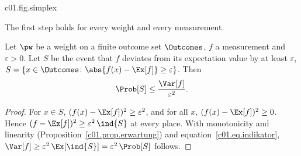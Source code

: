 \begin{vertiefung}
  \begin{tpcfigure}{c01.fig.simplex}
    \caption{The set of all weights. (a) Two outcomes: the segment between the point
      weights $\pw_1 = (1,0)$ and $\pw_2 = (0,1)$ in the plane of the coordinates
      $\pw(1)$, $\pw(2)$; marked is $\pw = (\tfrac14, \tfrac34)$. (b) Three
      outcomes: a triangle with the point weights as corners. Marked are the uniform
      weight $(\tfrac13, \tfrac13, \tfrac13)$ at the centroid and the weight
      $(\tfrac12, \tfrac13, \tfrac16)$, which lies closer to $\pw_1$. Filled points are
      point weights, open circles proper mixtures.}
  \end{tpcfigure}
\end{vertiefung}

\begin{vertiefung}[id=c01.v2,
    titel={How close are relative frequencies to the probabilities?},
    wozu={The Core restricts the statistical reading to independent repetitions of the
      same preparation. Here an upper bound on the probability of a deviation of the
      relative frequency by at least $\varepsilon > 0$ is proved; this bound decreases
      with the positive integer number of repetitions.},
    voraussetzung={Sections~\ref{c01.s2} and~\ref{c01.s3} up to
      equation~\eqref{c01.eq.var-indikator}. The rest of the course uses only the result
      in words.},
    zurueck={The probability that the relative frequency of an event after $N$ independent
      repetitions deviates from its probability by at least $\varepsilon$ is at most
      $1/(4N\varepsilon^2)$.}]
  The first step holds for every weight and every measurement.

  \begin{lemma}\label{c01.lem.tschebyscheff}
    Let $\pw$ be a weight on a finite outcome set $\Outcomes$, $f$ a measurement
    and $\varepsilon > 0$. Let $S$ be the event that $f$ deviates from its expectation
    value by at least $\varepsilon$,
    $S = \{x \in \Outcomes \colon \abs{f(x) - \Ex[f]} \geq \varepsilon\}$. Then
    \begin{equation}\label{c01.eq.tschebyscheff}
      \Prob[S] \leq \frac{\Var[f]}{\varepsilon^2} .
    \end{equation}
  \end{lemma}
  \begin{proof}
    For $x \in S$, $(f(x) - \Ex[f])^2 \geq \varepsilon^2$, and for all $x$,
    $(f(x) - \Ex[f])^2 \geq 0$. Hence $(f - \Ex[f])^2 \geq \varepsilon^2\, \ind{S}$ at
    every place. With monotonicity and linearity (Proposition~\ref{c01.prop.erwartung}) and
    equation~\eqref{c01.eq.indikator},
    $\Var[f] \geq \varepsilon^2\, \Ex[\ind{S}] = \varepsilon^2\, \Prob[S]$ follows.
  \end{proof}


\end{vertiefung}
